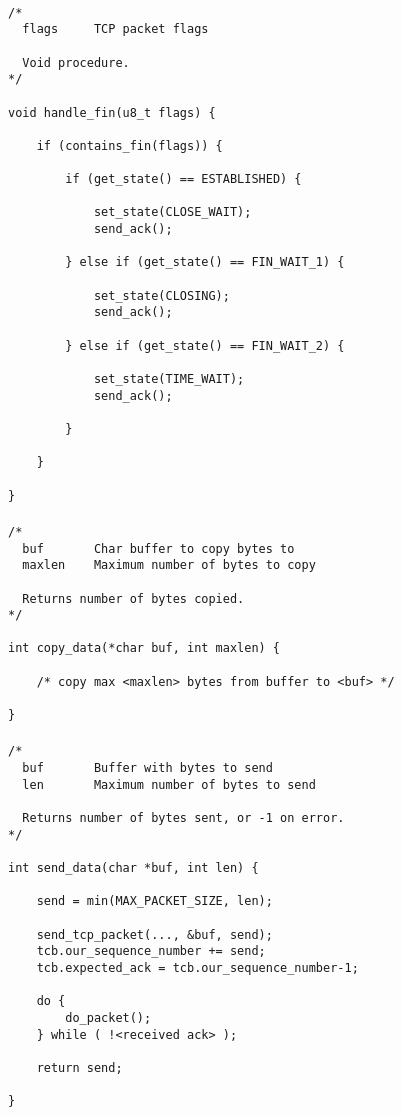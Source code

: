 \documentclass[11pt]{article}
\begin{document}
\paragraph{}


\begin{lstlisting}[title=Procedure handle\_fin]
/*
  flags     TCP packet flags

  Void procedure.
*/

void handle_fin(u8_t flags) {

    if (contains_fin(flags)) {

        if (get_state() == ESTABLISHED) {

            set_state(CLOSE_WAIT);
            send_ack();

        } else if (get_state() == FIN_WAIT_1) {

            set_state(CLOSING);
            send_ack();

        } else if (get_state() == FIN_WAIT_2) {

            set_state(TIME_WAIT);
            send_ack();

        }

    }

}
\end{lstlisting}


\paragraph{}


\begin{lstlisting}[title=Procedure copy\_data]
/*
  buf       Char buffer to copy bytes to
  maxlen    Maximum number of bytes to copy

  Returns number of bytes copied.
*/

int copy_data(*char buf, int maxlen) {

    /* copy max <maxlen> bytes from buffer to <buf> */

}
\end{lstlisting}


\paragraph{}


\begin{lstlisting}[title=Procedure send\_data]
/*
  buf       Buffer with bytes to send
  len       Maximum number of bytes to send

  Returns number of bytes sent, or -1 on error.
*/

int send_data(char *buf, int len) {

    send = min(MAX_PACKET_SIZE, len);

    send_tcp_packet(..., &buf, send);
    tcb.our_sequence_number += send;
    tcb.expected_ack = tcb.our_sequence_number-1;

    do {
        do_packet();
    } while ( !<received ack> );

    return send;

}
\end{lstlisting}
\end{document}
